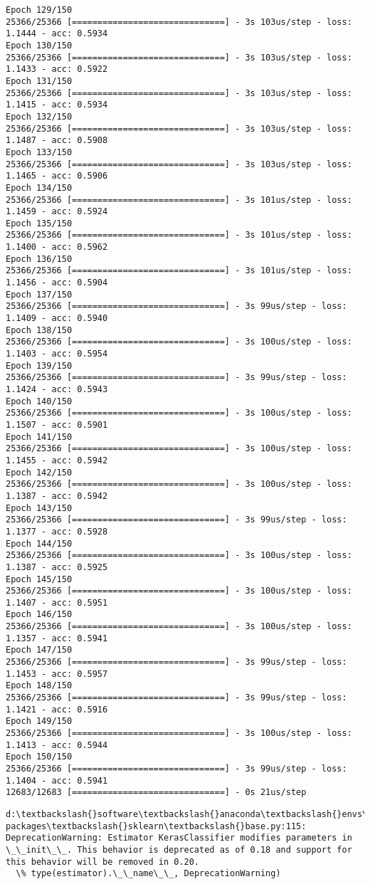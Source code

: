\documentclass[11pt]{article}
\begin{document}
\begin{Verbatim}[commandchars=\\\{\}]
Epoch 129/150
25366/25366 [==============================] - 3s 103us/step - loss: 1.1444 - acc: 0.5934
Epoch 130/150
25366/25366 [==============================] - 3s 103us/step - loss: 1.1433 - acc: 0.5922
Epoch 131/150
25366/25366 [==============================] - 3s 103us/step - loss: 1.1415 - acc: 0.5934
Epoch 132/150
25366/25366 [==============================] - 3s 103us/step - loss: 1.1487 - acc: 0.5908
Epoch 133/150
25366/25366 [==============================] - 3s 103us/step - loss: 1.1465 - acc: 0.5906
Epoch 134/150
25366/25366 [==============================] - 3s 101us/step - loss: 1.1459 - acc: 0.5924
Epoch 135/150
25366/25366 [==============================] - 3s 101us/step - loss: 1.1400 - acc: 0.5962
Epoch 136/150
25366/25366 [==============================] - 3s 101us/step - loss: 1.1456 - acc: 0.5904
Epoch 137/150
25366/25366 [==============================] - 3s 99us/step - loss: 1.1409 - acc: 0.5940
Epoch 138/150
25366/25366 [==============================] - 3s 100us/step - loss: 1.1403 - acc: 0.5954
Epoch 139/150
25366/25366 [==============================] - 3s 99us/step - loss: 1.1424 - acc: 0.5943
Epoch 140/150
25366/25366 [==============================] - 3s 100us/step - loss: 1.1507 - acc: 0.5901
Epoch 141/150
25366/25366 [==============================] - 3s 100us/step - loss: 1.1455 - acc: 0.5942
Epoch 142/150
25366/25366 [==============================] - 3s 100us/step - loss: 1.1387 - acc: 0.5942
Epoch 143/150
25366/25366 [==============================] - 3s 99us/step - loss: 1.1377 - acc: 0.5928
Epoch 144/150
25366/25366 [==============================] - 3s 100us/step - loss: 1.1387 - acc: 0.5925
Epoch 145/150
25366/25366 [==============================] - 3s 100us/step - loss: 1.1407 - acc: 0.5951
Epoch 146/150
25366/25366 [==============================] - 3s 100us/step - loss: 1.1357 - acc: 0.5941
Epoch 147/150
25366/25366 [==============================] - 3s 99us/step - loss: 1.1453 - acc: 0.5957
Epoch 148/150
25366/25366 [==============================] - 3s 99us/step - loss: 1.1421 - acc: 0.5916
Epoch 149/150
25366/25366 [==============================] - 3s 100us/step - loss: 1.1413 - acc: 0.5944
Epoch 150/150
25366/25366 [==============================] - 3s 99us/step - loss: 1.1404 - acc: 0.5941
12683/12683 [==============================] - 0s 21us/step

    \end{Verbatim}

    \begin{Verbatim}[commandchars=\\\{\}]
d:\textbackslash{}software\textbackslash{}anaconda\textbackslash{}envs\textbackslash{}tensorflow\textbackslash{}lib\textbackslash{}site-packages\textbackslash{}sklearn\textbackslash{}base.py:115: DeprecationWarning: Estimator KerasClassifier modifies parameters in \_\_init\_\_. This behavior is deprecated as of 0.18 and support for this behavior will be removed in 0.20.
  \% type(estimator).\_\_name\_\_, DeprecationWarning)

    \end{Verbatim}
\end{document}
